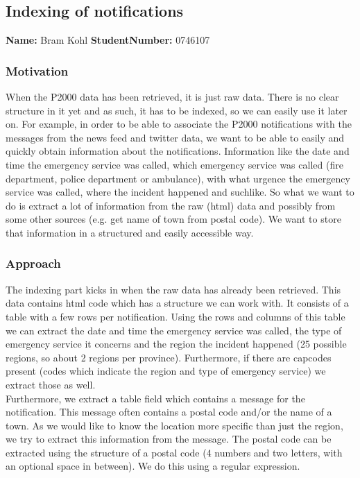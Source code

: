 \subsection{Indexing of notifications}
\textbf{Name:} Bram Kohl \indent \textbf{StudentNumber:} 0746107

\subsubsection*{Motivation}
When the P2000 data has been retrieved, it is just raw data. There is no clear structure in it yet and as such, it has to be indexed, so we can easily use it later on. For example, in order to be able to associate the P2000 notifications with the messages from the news feed and twitter data, we want to be able to easily and quickly obtain information about the notifications. Information like the date and time the emergency service was called, which emergency service was called (fire department, police department or ambulance), with what urgence the emergency service was called, where the incident happened and suchlike. So what we want to do is extract a lot of information from the raw (html) data and possibly from some other sources (e.g. get name of town from postal code). We want to store that information in a structured and easily accessible way.
\subsubsection*{Approach}
The indexing part kicks in when the raw data has already been retrieved. This data contains html code which has a structure we can work with. It consists of a table with a few rows per notification. Using the rows and columns of this table we can extract the date and time the emergency service was called, the type of emergency service it concerns and the region the incident happened (25 possible regions, so about 2 regions per province). Furthermore, if there are capcodes present (codes which indicate the region and type of emergency service) we extract those as well.\\

Furthermore, we extract a table field which contains a message for the notification. This message often contains a postal code and/or the name of a town. As we would like to know the location more specific than just the region, we try to extract this information from the message.
The postal code can be extracted using the structure of a postal code (4 numbers and two letters, with an optional space in between). We do this using a regular expression.\\

